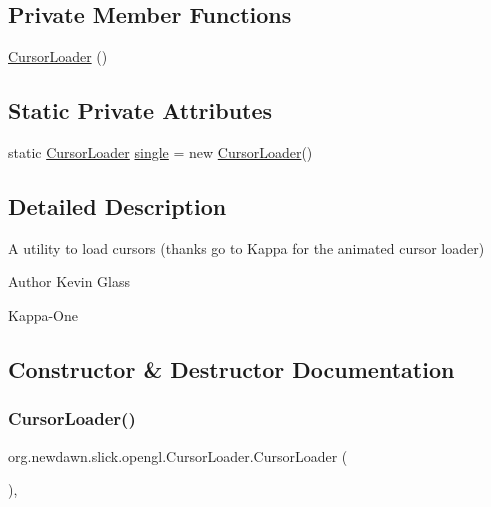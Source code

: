 \subsection*{Private Member Functions}
\begin{DoxyCompactItemize}
\item 
\mbox{\hyperlink{classorg_1_1newdawn_1_1slick_1_1opengl_1_1_cursor_loader_a9393afc9bc9126a7e07ee1754f56f3c4}{Cursor\+Loader}} ()
\end{DoxyCompactItemize}
\subsection*{Static Private Attributes}
\begin{DoxyCompactItemize}
\item 
static \mbox{\hyperlink{classorg_1_1newdawn_1_1slick_1_1opengl_1_1_cursor_loader}{Cursor\+Loader}} \mbox{\hyperlink{classorg_1_1newdawn_1_1slick_1_1opengl_1_1_cursor_loader_a0550bb212ff0bdb84ff32b244360c40e}{single}} = new \mbox{\hyperlink{classorg_1_1newdawn_1_1slick_1_1opengl_1_1_cursor_loader}{Cursor\+Loader}}()
\end{DoxyCompactItemize}


\subsection{Detailed Description}
A utility to load cursors (thanks go to Kappa for the animated cursor loader)

\begin{DoxyAuthor}{Author}
Kevin Glass 

Kappa-\/\+One 
\end{DoxyAuthor}


\subsection{Constructor \& Destructor Documentation}
\mbox{\label{classorg_1_1newdawn_1_1slick_1_1opengl_1_1_cursor_loader_a9393afc9bc9126a7e07ee1754f56f3c4}} 
\subsubsection{\texorpdfstring{Cursor\+Loader()}{CursorLoader()}}
{\footnotesize\ttfamily org.\+newdawn.\+slick.\+opengl.\+Cursor\+Loader.\+Cursor\+Loader (\begin{DoxyParamCaption}{ }\end{DoxyParamCaption})\hspace{0.3cm}{\ttfamily [inline]}, {\ttfamily [private]}}

